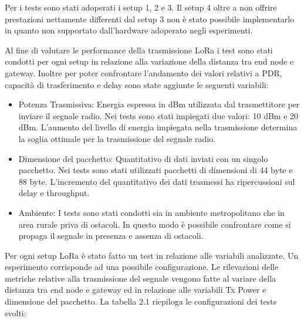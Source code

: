 \documentclass[12pt,a4paper,openright,twoside]{report}
\begin{document}
Per i tests sono stati adoperati i setup 1, 2 e 3. Il setup 4 oltre a non offrire prestazioni nettamente differenti dal setup 3 non \`e stato possibile implementarlo in quanto non supportato dall'hardware adoperato negli esperimenti.  

Al fine di valutare le performance della trasmissione LoRa i test sono stati condotti per ogni setup in relazione alla variazione della distanza tra end node e gateway. Inoltre per poter confrontare l'andamento dei valori relativi a PDR, capacit\`a di trasferimento e delay sono state aggiunte le seguenti variabili:   
\begin{itemize}   
\item Potenza Trasmissiva: Energia espressa in dBm utilizzata dal trasmettitore per inviare il segnale radio. Nei tests sono stati impiegati due valori: 10 dBm e 20 dBm. L'aumento del livello di energia impiegata nella trasmissione determina la soglia ottimale per la trasmissione del segnale radio.     
\item Dimensione del pacchetto: Quantitativo di dati inviati con un singolo pacchetto. Nei tests sono stati utilizzati pacchetti di dimensioni di 44 byte e 88 byte. L'incremento del quantitativo dei dati trasmessi ha ripercussioni sul delay e throughput.   
\item Ambiente: I tests sono stati condotti sia in ambiente metropolitano che in area rurale priva di ostacoli. In questo modo \`e possibile confrontare come si propaga il segnale in presenza e assenza di ostacoli. 
\end{itemize}

Per ogni setup LoRa \`e stato fatto un test in relazione alle variabili analizzate.
Un esperimento corrisponde ad una possibile configurazione. Le rilevazioni delle metriche relative alla trasmissione del segnale vengono fatte al variare della distanza tra end node e gateway ed in relazione alle variabili Tx Power e dimensione del pacchetto. 
La tabella 2.1 riepiloga le configurazioni dei tests svolti:
\end{document}
